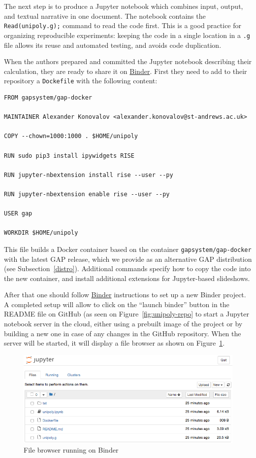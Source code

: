 \documentclass{deliverablereport}
\begin{document}
The next step is to produce a Jupyter notebook which combines input,
output, and textual narrative in one document. The notebook contains
the {\tt Read(unipoly.g);} command to read the code first. This is
a good practice for organizing reproducible experiments: keeping the
code in a single location in a {\tt .g} file allows its reuse and
automated testing, and avoids code duplication. 

When the authors prepared and committed the Jupyter notebook describing
their calculation, they are ready to share it on
\href{https://mybinder.org/}{Binder}. First they need to add 
to their repository a {\tt Dockefile} with the following content:

{\tiny
\begin{verbatim}
FROM gapsystem/gap-docker

MAINTAINER Alexander Konovalov <alexander.konovalov@st-andrews.ac.uk>

COPY --chown=1000:1000 . $HOME/unipoly

RUN sudo pip3 install ipywidgets RISE

RUN jupyter-nbextension install rise --user --py

RUN jupyter-nbextension enable rise --user --py

USER gap

WORKDIR $HOME/unipoly
\end{verbatim}
}

This file builds a Docker container based on the container {\tt gapsystem/gap-docker}
with the latest GAP release, which we provide as an alternative GAP distribution
(see Subsection~\ref{distro}). Additional commands specify how to copy the code into
the new container, and install additional extensions for Jupyter-based slideshows.

After that one should follow \href{https://mybinder.org/}{Binder} instructions to
set up a new Binder project. A completed setup will allow to click on the ``launch binder''
button in the README file on GitHub (as seen on Figure~\ref{fig:unipoly-repo}
to start a Jupyter notebook server in the cloud,
either using a prebuilt image of the project or by building a new one in case of any
changes in the GitHub repository. When the server will be started, it will display
a file browser as shown on Figure~\ref{fig:unipoly-files}.

\begin{figure}[!ht]
    \centering
    \includegraphics[width=\textwidth]{images/unipoly-files}
    \caption{File browser running on Binder}
    \label{fig:unipoly-files}
\end{figure}
\end{document}
